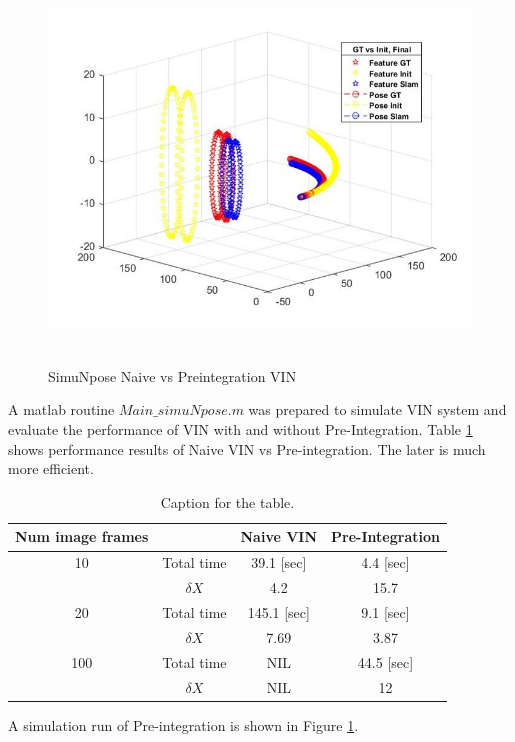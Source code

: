 \documentclass[12pt]{article}   %
\begin{document}
\begin{figure}[ht!]
	\label{fig:simuNpose}
	\includegraphics[height=10.3cm]{figures/SimuNpose_simData.jpg}
	\caption{SimuNpose Naive vs Preintegration VIN}
\end{figure}

A matlab routine $Main\_simuNpose.m$ was prepared to simulate VIN system and evaluate the performance of VIN with and without Pre-Integration.
Table \ref{tab:table1} shows performance results of Naive VIN vs Pre-integration. The later is much more efficient.
\begin{table}[h!]
	\centering
	\caption{Caption for the table.}
	\label{tab:table1}
	\begin{tabular}{cc|c|c}
		Num image frames &  & Naive VIN & Pre-Integration\\
		\hline
		10 & Total time & 39.1 [sec] & 4.4 [sec]\\
		{} & $\delta X$ & 4.2 & 15.7\\
		\hline
		20 & Total time & 145.1 [sec] & 9.1 [sec]\\
		{} & $\delta X$ & 7.69 & 3.87\\
		\hline
		100 & Total time & NIL & 44.5 [sec]\\
		{} & $\delta X$ & NIL & 12\\		
	\end{tabular}
\end{table}


A simulation run of Pre-integration is shown in Figure \ref{fig:simuNpose}. 
\end{document}
